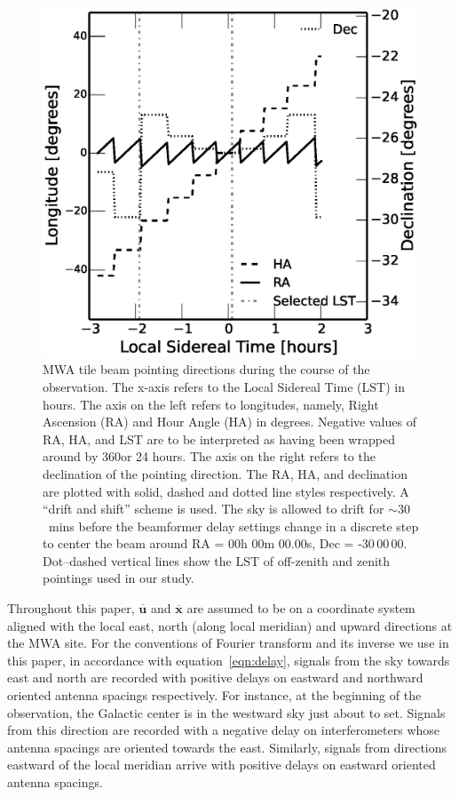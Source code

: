 \documentclass[preprint2,iop,numberedappendix]{emulateapj}
\begin{document}
\begin{figure}[htb]
\centering
\includegraphics[width=\linewidth]{figures/v1_0/custom_pointings.eps}
\caption{MWA tile beam pointing directions during the course of the observation. The x-axis refers to the Local Sidereal Time (LST) in hours. The axis on the left refers to longitudes, namely, Right Ascension (RA) and Hour Angle (HA) in degrees. Negative values of RA, HA, and LST are to be interpreted as having been wrapped around by 360\arcdeg or 24 hours. The axis on the right refers to the declination of the pointing direction. The RA, HA, and declination are plotted with solid, dashed and dotted line styles respectively. A ``drift and shift'' scheme is used. The sky is allowed to drift for $\sim 30$~mins before the beamformer delay settings change in a discrete step to center the beam around RA = 00h 00m 00.00s, Dec = -30\arcdeg$\,$00\arcmin$\,$00. Dot--dashed vertical lines show the LST of off-zenith and zenith pointings used in our study. \label{fig:pointings}}
\end{figure}

Throughout this paper, $\overline{\mathbf{u}}$ and $\overline{\mathbf{x}}$ are assumed to be on a coordinate system aligned with the local east, north (along local meridian) and upward directions at the MWA site. For the conventions of Fourier transform and its inverse we use in this paper, in accordance with equation~\ref{eqn:delay}, signals from the sky towards east and north are recorded with positive delays on eastward and northward oriented antenna spacings respectively. For instance, at the beginning of the observation, the Galactic center is in the westward sky just about to set. Signals from this direction are recorded with a negative delay on interferometers whose antenna spacings are oriented towards the east. Similarly, signals from directions eastward of the local meridian arrive with positive delays on eastward oriented antenna spacings. 
\end{document}
